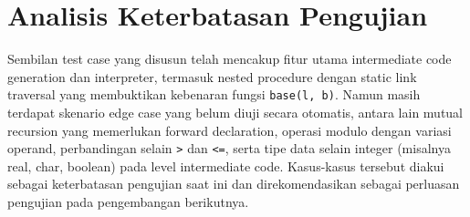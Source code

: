 \section{Analisis Keterbatasan Pengujian}
Sembilan test case yang disusun telah mencakup fitur utama intermediate code generation dan interpreter, termasuk nested procedure dengan static link traversal yang membuktikan kebenaran fungsi \texttt{base(l, b)}. Namun masih terdapat skenario edge case yang belum diuji secara otomatis, antara lain mutual recursion yang memerlukan forward declaration, operasi modulo dengan variasi operand, perbandingan selain \texttt{>} dan \texttt{<=}, serta tipe data selain integer (misalnya real, char, boolean) pada level intermediate code. Kasus-kasus tersebut diakui sebagai keterbatasan pengujian saat ini dan direkomendasikan sebagai perluasan pengujian pada pengembangan berikutnya.
